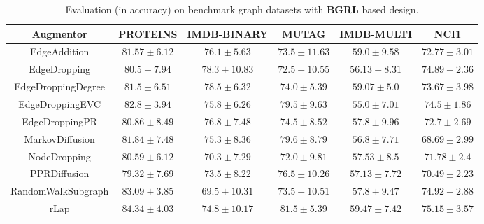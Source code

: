 \documentclass{article}
\theoremstyle{plain}
\theoremstyle{definition}
\theoremstyle{remark}
\begin{document}
\begin{table*}[ht!]
\centering
\caption{Evaluation (in accuracy) on benchmark graph datasets with \textbf{BGRL} based design. }
\label{table:results_bgrl}
\vskip 0.15in
\begin{center}
\begin{small}
\begin{sc}
\begin{tabular}{c|c|c|c|c|c}
\toprule
Augmentor & PROTEINS & IMDB-BINARY & MUTAG &  IMDB-MULTI & NCI1\\
\midrule
EdgeAddition & $81.57 \pm 6.12$  & $76.1 \pm 5.63$  & $73.5 \pm 11.63$  & $59.0 \pm 9.58$ & $72.77 \pm 3.01$ \\
EdgeDropping & $80.5 \pm 7.94$  &  \underline{$78.3 \pm 10.83$} & $72.5 \pm 10.55$ & $56.13 \pm 8.31$ & $74.89 \pm 2.36$ \\
EdgeDroppingDegree & $81.5 \pm 6.51$ &  $\mathbf{78.5 \pm 6.32}$  & $74.0 \pm 5.39$ & \underline{$59.07 \pm 5.0$} & $73.67 \pm 3.98$ \\
EdgeDroppingEVC &  $82.8 \pm 3.94$ & $75.8 \pm 6.26$  & $79.5 \pm 9.63$  & $55.0 \pm 7.01$ & $74.5 \pm 1.86$ \\
EdgeDroppingPR & $80.86 \pm 8.49$  & $76.8 \pm 7.48$   & $74.5 \pm 8.52$ &  $57.8 \pm 9.96$ & $72.7 \pm 2.69$ \\
MarkovDiffusion & $81.84 \pm 7.48$  & $75.3 \pm 8.36$   & \underline{$79.6 \pm 8.79$} &  $56.8 \pm 7.71$ & $68.69 \pm 2.99$  \\
NodeDropping & $80.59 \pm 6.12$   & $70.3 \pm 7.29$  & $72.0 \pm 9.81$ & $57.53 \pm 8.5$ & $71.78 \pm 2.4$ \\
PPRDiffusion &  $79.32 \pm 7.69$ & $73.5 \pm 8.22$  & $76.5 \pm 10.26$ &  $57.13 \pm 7.72$ & $70.49 \pm 2.23$ \\
RandomWalkSubgraph & \underline{$83.09 \pm 3.85$}  & $69.5 \pm 10.31$& $73.5 \pm 10.51$ &  $57.8 \pm 9.47$ & \underline{$74.92 \pm 2.88$} \\
rLap & $\mathbf{84.34 \pm 4.03}$ & $74.8 \pm 10.17$  & $\mathbf{81.5 \pm 5.39}$ & $\mathbf{59.47 \pm 7.42}$ & $\mathbf{75.15 \pm 3.57}$   \\
\bottomrule
\end{tabular}
\end{sc}
\end{small}
\end{center}
\vskip -0.1in
\end{table*}
\end{document}
